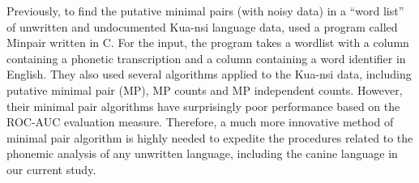 Previously, to find the putative minimal pairs (with noisy data) in a ``word list'' of unwritten and undocumented Kua-nsi language data, \citet{kempton2014discovering} used a program called Minpair written in C. For the input, the program takes a wordlist with a column containing a phonetic transcription and a column containing a word identifier in English. They also used several algorithms applied to the Kua-nsi data, including putative minimal pair (MP), MP counts and MP independent counts. However, their minimal pair algorithms have surprisingly poor performance based on the ROC-AUC evaluation measure. Therefore, a much more innovative method of minimal pair algorithm is highly needed to expedite the procedures related to the phonemic analysis of any unwritten language, including the canine language in our current study. 

